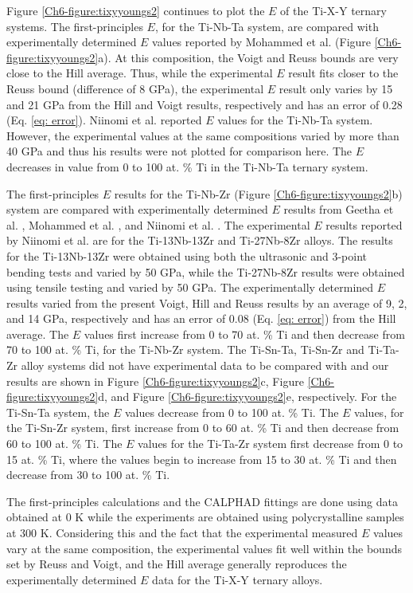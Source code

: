 Figure \ref{Ch6-figure:tixyyoungs2} continues to plot the $E$ of the Ti-X-Y ternary systems. The first-principles $E$, for the Ti-Nb-Ta system, are compared with experimentally determined $E$ values reported by Mohammed et al. \cite{Mohammed2014} (Figure \ref{Ch6-figure:tixyyoungs2}a). At this composition, the Voigt and Reuss bounds are very close to the Hill average. Thus, while the experimental $E$ result fits closer to the Reuss bound (difference of 8 GPa), the experimental $E$ result only varies by 15 and 21 GPa from the Hill and Voigt results, respectively and has an error of 0.28 (Eq. \ref{eq: error}). Niinomi et al. \cite{Niinomi2012} reported $E$ values for the Ti-Nb-Ta system. However, the experimental values at the same compositions varied by more than 40 GPa and thus his results were not plotted for comparison here. The $E$ decreases in value from 0 to 100 at. \% Ti in the Ti-Nb-Ta ternary system. 

The first-principles $E$ results for the Ti-Nb-Zr (Figure \ref{Ch6-figure:tixyyoungs2}b) system are compared with experimentally determined $E$ results from Geetha et al. \cite{Geetha2009},  Mohammed et al. \cite{Mohammed2014}, and Niinomi et al. \cite{Niinomi2012}. The experimental $E$ results reported by Niinomi et al. \cite{Niinomi2012} are for the Ti-13Nb-13Zr and Ti-27Nb-8Zr alloys. The results for the Ti-13Nb-13Zr were obtained using both the ultrasonic and 3-point bending tests and varied by 50 GPa, while the Ti-27Nb-8Zr results were obtained using tensile testing and varied by 50 GPa. The experimentally determined $E$ results varied from the present Voigt, Hill and Reuss results by an average of 9, 2, and 14 GPa, respectively and has an error of 0.08 (Eq. \ref{eq: error}) from the Hill average. The $E$ values first increase from 0 to 70 at. \% Ti and then decrease from 70 to 100 at. \% Ti, for the Ti-Nb-Zr system. The Ti-Sn-Ta, Ti-Sn-Zr and Ti-Ta-Zr alloy systems did not have experimental data to be compared with and our results are shown in Figure \ref{Ch6-figure:tixyyoungs2}c, Figure \ref{Ch6-figure:tixyyoungs2}d, and Figure \ref{Ch6-figure:tixyyoungs2}e, respectively. For the Ti-Sn-Ta system, the $E$ values decrease from 0 to 100 at. \% Ti. The $E$ values, for the Ti-Sn-Zr system, first increase from 0 to 60 at. \% Ti and then decrease from 60 to 100 at. \% Ti. The $E$ values for the Ti-Ta-Zr system first decrease from 0 to 15 at. \% Ti, where the values begin to increase from 15 to 30 at. \% Ti and then decrease from 30 to 100 at. \% Ti. 

The first-principles calculations and the CALPHAD fittings are done using data obtained at 0 K while the experiments are obtained using polycrystalline samples at 300 K. Considering this and the fact that the experimental measured $E$ values vary at the same composition, the experimental values fit well within the bounds set by Reuss and Voigt, and the Hill average generally reproduces the experimentally determined $E$ data for the Ti-X-Y ternary alloys. 

